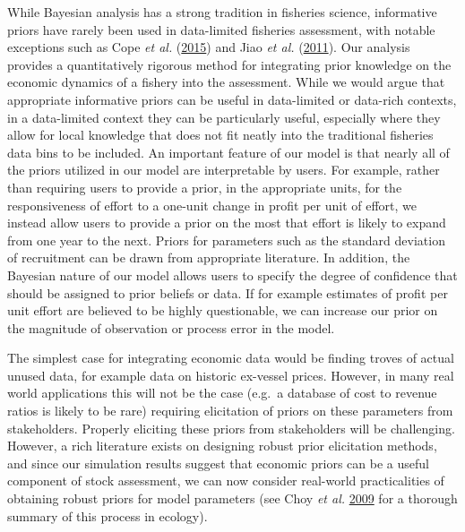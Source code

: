 \documentclass[twoside,12pt,final]{ucthesis-CA2012}
\begin{document}
\begin{ucmainmatter}
While Bayesian analysis has a strong tradition in fisheries science,
informative priors have rarely been used in data-limited fisheries
assessment, with notable exceptions such as Cope \emph{et al.}
(\protect\hyperlink{ref-Cope2015}{2015}) and Jiao \emph{et al.}
(\protect\hyperlink{ref-Jiao2011}{2011}). Our analysis provides a
quantitatively rigorous method for integrating prior knowledge on the
economic dynamics of a fishery into the assessment. While we would argue
that appropriate informative priors can be useful in data-limited or
data-rich contexts, in a data-limited context they can be particularly
useful, especially where they allow for local knowledge that does not
fit neatly into the traditional fisheries data bins to be included. An
important feature of our model is that nearly all of the priors utilized
in our model are interpretable by users. For example, rather than
requiring users to provide a prior, in the appropriate units, for the
responsiveness of effort to a one-unit change in profit per unit of
effort, we instead allow users to provide a prior on the most that
effort is likely to expand from one year to the next. Priors for
parameters such as the standard deviation of recruitment can be drawn
from appropriate literature. In addition, the Bayesian nature of our
model allows users to specify the degree of confidence that should be
assigned to prior beliefs or data. If for example estimates of profit
per unit effort are believed to be highly questionable, we can increase
our prior on the magnitude of observation or process error in the model.

The simplest case for integrating economic data would be finding troves
of actual unused data, for example data on historic ex-vessel prices.
However, in many real world applications this will not be the case
(e.g.~a database of cost to revenue ratios is likely to be rare)
requiring elicitation of priors on these parameters from stakeholders.
Properly eliciting these priors from stakeholders will be challenging.
However, a rich literature exists on designing robust prior elicitation
methods, and since our simulation results suggest that economic priors
can be a useful component of stock assessment, we can now consider
real-world practicalities of obtaining robust priors for model
parameters (see Choy \emph{et al.}
\protect\hyperlink{ref-Choy2009}{2009} for a thorough summary of this
process in ecology).


\end{ucmainmatter}
\end{document}
